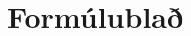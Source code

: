 \documentclass[9pt,a4paper,landscape,oneside]{amsart}
\title{Formúlublað}
\subtitle{}
\date{\ddmmyyyydate{\today{}}}
\theoremstyle{plain}
\theoremstyle{definition}
\theoremstyle{remark}
\begin{document}
\thispagestyle{fancy}
\raggedright
\footnotesize
\raggedcolumns
\begin{multicols*}{3}
\setlength{\premulticols}{1pt}
\setlength{\postmulticols}{1pt}
\setlength{\multicolsep}{1pt}
\setlength{\columnsep}{2pt}

\end{multicols*}
\end{document}
